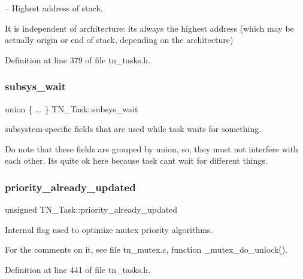 -- Highest address of stack. 

It is independent of architecture\+: it\textquotesingle{}s always the highest address (which may be actually origin or end of stack, depending on the architecture) 

Definition at line 379 of file tn\+\_\+tasks.\+h.

\mbox{\label{structTN__Task_ae6f4bd3d67e5499ef2c5fb7c72ec6276}} 
\subsubsection{\texorpdfstring{subsys\+\_\+wait}{subsys\_wait}}
{\footnotesize\ttfamily union \{ ... \}   T\+N\+\_\+\+Task\+::subsys\+\_\+wait}



subsystem-\/specific fields that are used while task waits for something. 

Do note that these fields are grouped by union, so, they must not interfere with each other. It\textquotesingle{}s quite ok here because task can\textquotesingle{}t wait for different things. \mbox{\label{structTN__Task_abb4d22974c7317dd610f646b9048656d}} 
\subsubsection{\texorpdfstring{priority\+\_\+already\+\_\+updated}{priority\_already\_updated}}
{\footnotesize\ttfamily unsigned T\+N\+\_\+\+Task\+::priority\+\_\+already\+\_\+updated}



Internal flag used to optimize mutex priority algorithms. 

For the comments on it, see file tn\+\_\+mutex.\+c, function {\ttfamily \+\_\+mutex\+\_\+do\+\_\+unlock()}. 

Definition at line 441 of file tn\+\_\+tasks.\+h.

\mbox{\label{structTN__Task_a47c3a0a27be1ee526a1599a2ca8bb269}} 

